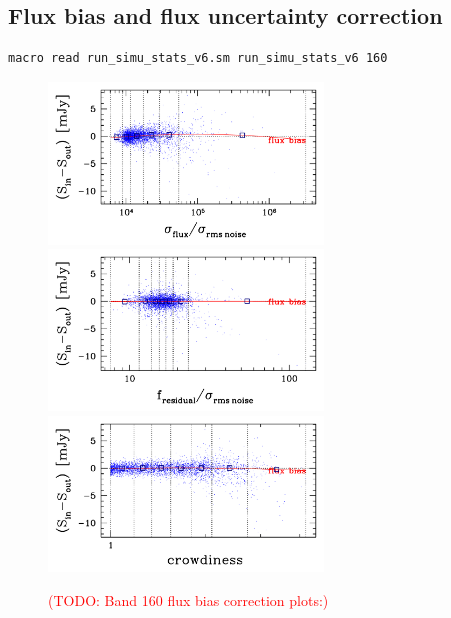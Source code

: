 \documentclass[11pt,a4paper]{article}
\begin{document}
\subsection{Flux bias and flux uncertainty correction}
\label{Band160_dfcorr}

\begin{lstlisting}[language=bash]
macro read run_simu_stats_v6.sm run_simu_stats_v6 160
\end{lstlisting}

\begin{figure}[H]
	\caption{
		\textcolor{red}{(TODO: Band 160 flux bias correction plots:)}
	}
	\includegraphics[width=0.65\textwidth]{galsim_160_fbias_1}
	\includegraphics[width=0.65\textwidth]{galsim_160_fbias_2}
	\includegraphics[width=0.65\textwidth]{galsim_160_fbias_3}
\end{figure}
\end{document}
